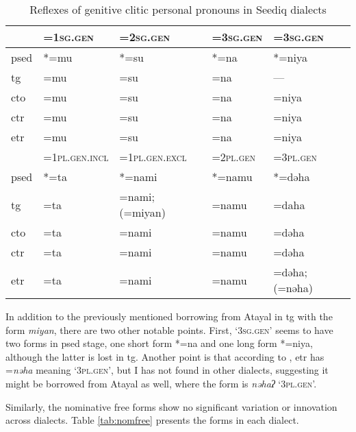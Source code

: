 \begin{table}[!htbp]
\centering
\caption{Reflexes of genitive clitic personal pronouns in Seediq dialects}
\label{tab:genclitic}
\begin{tabular}{lllll}
\hline
      & =\textsc{1sg.gen}      & =\textsc{2sg.gen}        & =\textsc{3sg.gen} & =\textsc{3sg.gen}       \\ \hline
\acs{psed} & *=mu          & *=su            & *=na     & *=niya         \\
\acs{tg}  & =mu           & =su             & =na      & ---            \\
\acs{cto}  & =mu           & =su             & =na      & =niya          \\
\acs{ctr} & =mu           & =su             & =na      & =niya          \\
\acs{etr} & =mu           & =su             & =na      & =niya          \\ \hline
      & =\textsc{1pl.gen.incl} & =\textsc{1pl.gen.excl}   & =\textsc{2pl.gen} & =\textsc{3pl.gen}       \\ \hline
\acs{psed} & *=ta          & *=nami          & *=namu   & *=dəha         \\
\acs{tg}  & =ta           & =nami; (=miyan) & =namu    & =daha          \\
\acs{cto}  & =ta           & =nami           & =namu    & =dəha          \\
\acs{ctr} & =ta           & =nami           & =namu    & =dəha          \\
\acs{etr} & =ta           & =nami           & =namu    & =dəha; (=nəha) \\ \hline
\end{tabular}
\end{table}

In addition to the previously mentioned borrowing from Atayal in \acl{tg} with the form \textit{miyan}, there are two other notable points. First, `\textsc{3sg.gen}' seems to have two forms in \acl{psed} stage, one short form *=na and one long form *=niya, although the latter is lost in \acl{tg}. Another point is that according to \textcite{Lee2022TrukuPOS}, \acl{etr} has =\textit{nəha} meaning `\textsc{3pl.gen}', but I has not found in other dialects, suggesting it might be borrowed from Atayal as well, where the form is \textit{nəhaʔ} `\textsc{3pl.gen}'.


Similarly, the nominative free forms show no significant variation or innovation across dialects. Table \ref{tab:nomfree} presents the forms in each dialect.


